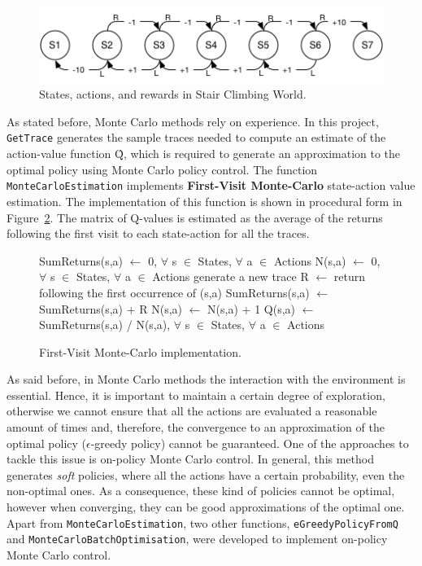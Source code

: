 \documentclass[10pt]{article}   	%
\begin{document}
\begin{figure}[!h]
\centering
\includegraphics[scale=0.6]{./figures/StairClimbingMDP}
\caption{States, actions, and rewards in Stair Climbing World.\label{fig:stairMdp}}
\end{figure}

As stated before, Monte Carlo methods rely on experience. In this project, \texttt{GetTrace} generates the sample traces needed to compute an estimate of the action-value function \^{Q}, which is required to generate an approximation to the optimal policy using Monte Carlo policy control. The function \texttt{MonteCarloEstimation} implements \textbf{First-Visit Monte-Carlo} state-action value estimation. The implementation of this function is shown in procedural form in Figure~\ref{fig:mcfv}. The matrix of Q-values is estimated as the average of the returns following the first visit to each state-action for all the traces.
\begin{figure}[!ht]
\begin{framed}
\begin{algorithmic}
 	\STATE SumReturns(s,a) $\leftarrow$ 0, $\forall$ s $\in$ States, $\forall$ a $\in$ Actions\;
 	\STATE N(s,a) $\leftarrow$ 0, $\forall$ s $\in$ States, $\forall$ a $\in$ Actions\;
  		\STATE generate a new trace\;
   			\STATE R $\leftarrow$ return following the first occurrence of (s,a)\;
   			\STATE SumReturns(s,a) $\leftarrow$ SumReturns(s,a) + R\;
   			\STATE N(s,a) $\leftarrow$ N(s,a) + 1\;
  		\ENDIF
 	 \ENDFOR
 \STATE Q(s,a) $\leftarrow$ SumReturns(s,a) / N(s,a), $\forall$ s $\in$ States, $\forall$ a $\in$ Actions\;
\end{algorithmic}
\end{framed}
 \caption{First-Visit Monte-Carlo implementation.\label{fig:mcfv}}
 \end{figure}
 
As said before, in Monte Carlo methods the interaction with the environment is essential. Hence, it is important to maintain a certain degree of exploration, otherwise we cannot ensure that all the actions are evaluated a reasonable amount of times and, therefore, the convergence to an approximation of the optimal policy ($\epsilon$-greedy policy) cannot be guaranteed. One of the approaches to tackle this issue is on-policy Monte Carlo control. In general, this method generates \textit{soft} policies, where all the actions have a certain probability, even the non-optimal ones. As a consequence, these kind of policies cannot be optimal, however when converging, they can be good approximations of the optimal one. Apart from \texttt{MonteCarloEstimation}, two other functions, \texttt{eGreedyPolicyFromQ} and \texttt{MonteCarloBatchOptimisation}, were developed to implement on-policy Monte Carlo control.
\end{document}

